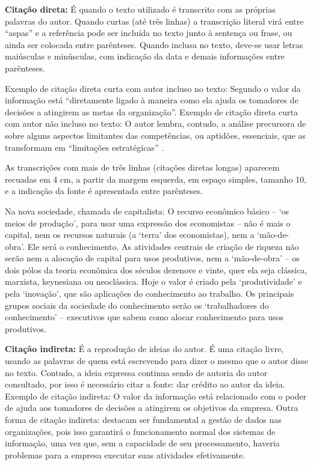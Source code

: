 \textbf{Citação direta:} É quando o texto utilizado é transcrito com as próprias palavras do autor. Quando curtas (até três linhas) a transcrição literal virá entre “aspas” e a referência pode ser incluída no texto junto à sentença ou frase, ou ainda ser colocada entre parênteses. Quando inclusa no texto, deve-se usar letras maiúsculas e minúsculas, com indicação da data e demais informações entre parênteses.

Exemplo de citação direta curta com autor incluso no texto: Segundo  o valor da informação está “diretamente ligado à maneira como ela ajuda os tomadores de decisões a atingirem as metas da organização”. Exemplo de citação direta curta com autor não incluso no texto: O autor lembra, contudo, a análise precursora de  sobre alguns aspectos limitantes das competências, ou aptidões, essenciais, que as transformam em “limitações estratégicas” \cite{Pressman2009}.

As transcrições com mais de três linhas (citações diretas longas) aparecem recuadas em 4 cm, a partir da margem esquerda, em espaço simples, tamanho 10, e a indicação da fonte é apresentada entre parênteses. 

\begin{citacao}
Na nova sociedade, chamada de capitalista: O recurso econômico básico – ‘os meios de produção’, para usar uma expressão dos economistas – não é mais o capital, nem os recursos naturais (a ‘terra’ dos economistas), nem a ‘mão-de-obra’. Ele será o conhecimento. As atividades centrais de criação de riqueza não serão nem a alocação de capital para usos produtivos, nem a ‘mão-de-obra’ – os dois pólos da teoria econômica dos séculos dezenove e vinte, quer ela seja clássica, marxista, keynesiana ou neoclássica. Hoje o valor é criado pela ‘produtividade’ e pela ‘inovação’, que são aplicações do conhecimento ao trabalho. Os principais grupos sociais da sociedade do conhecimento serão os ‘trabalhadores do conhecimento’ – executivos que sabem como alocar conhecimento para usos produtivos. \cite[p. 48]{Pressman2009}
\end{citacao}

\textbf{Citação indireta:} É a reprodução de ideias do autor. É uma citação livre, usando as palavras de quem está escrevendo para dizer o mesmo que o autor disse no texto. Contudo, a ideia expressa continua sendo de autoria do autor consultado, por isso é necessário citar a fonte: dar crédito ao autor da ideia. Exemplo de citação indireta: O valor da informação está relacionado com o poder de ajuda aos tomadores de decisões a atingirem os objetivos da empresa\cite{Pressman2009}. Outra forma de citação indireta:  destacam ser fundamental a gestão de dados nas organizações, pois isso garantirá o funcionamento normal dos sistemas de informação, uma vez que, sem a capacidade de seu processamento, haveria problemas para a empresa executar suas atividades efetivamente.

